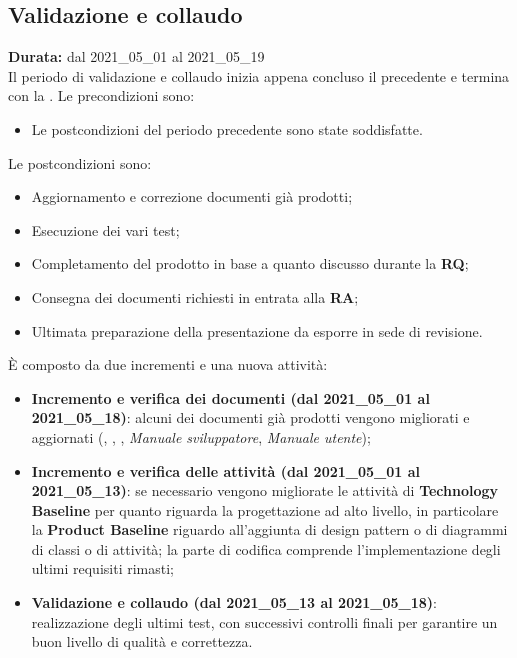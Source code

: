 \subsection{Validazione e collaudo}
\label{validazione_e_collaudo}
\textbf{Durata:} dal 2021\_05\_01 al 2021\_05\_19\\
Il periodo di validazione e collaudo inizia appena concluso il precedente e termina con la .
Le precondizioni sono:
\begin{itemize}
    \item Le postcondizioni del periodo precedente sono state soddisfatte.
\end{itemize}
Le postcondizioni sono:
\begin{itemize}
    \item Aggiornamento e correzione documenti già prodotti;
    \item Esecuzione dei vari test;
    \item Completamento del prodotto in base a quanto discusso durante la \textbf{RQ};
    \item Consegna dei documenti richiesti in entrata alla \textbf{RA};
    \item Ultimata preparazione della presentazione da esporre in sede di revisione.
\end{itemize}
È composto da due incrementi e una nuova attività:
\begin{itemize}
    \item \textbf{Incremento e verifica dei documenti (dal 2021\_05\_01 al 2021\_05\_18)}: alcuni dei documenti già prodotti vengono migliorati e aggiornati ({\NdP}, {\PdP}, {\PdQ}, \textit{Manuale sviluppatore}, \textit{Manuale utente}); 
    \item \textbf{Incremento e verifica delle attività (dal 2021\_05\_01 al 2021\_05\_13)}: se necessario vengono migliorate le attività di \textbf{Technology Baseline} per quanto riguarda la progettazione ad alto livello, in particolare la \textbf{Product Baseline} riguardo all'aggiunta di design pattern o di diagrammi di classi o di attività; la parte di codifica comprende l'implementazione degli ultimi requisiti rimasti;
    \item \textbf{Validazione e collaudo (dal 2021\_05\_13 al 2021\_05\_18)}: realizzazione degli ultimi test, con successivi controlli finali per garantire un buon livello di qualità e correttezza.
\end{itemize}
